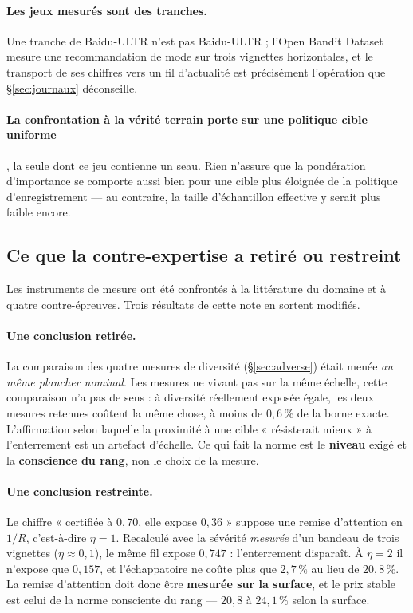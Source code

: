 \documentclass[11pt,a4paper]{article}
\begin{document}
\paragraph{Les jeux mesurés sont des tranches.} Une tranche de Baidu-ULTR n'est pas
Baidu-ULTR ; l'Open Bandit Dataset mesure une recommandation de mode sur trois vignettes
horizontales, et le transport de ses chiffres vers un fil d'actualité est précisément
l'opération que \S\ref{sec:journaux} déconseille.

\paragraph{La confrontation à la vérité terrain porte sur une politique cible uniforme}, la
seule dont ce jeu contienne un seau. Rien n'assure que la pondération d'importance se comporte
aussi bien pour une cible plus éloignée de la politique d'enregistrement --- au contraire, la
taille d'échantillon effective y serait plus faible encore.


\subsection{Ce que la contre-expertise a retiré ou restreint}
\label{sec:contreexpertise}

Les instruments de mesure ont été confrontés à la littérature du domaine et à quatre
contre-épreuves. Trois résultats de cette note en sortent modifiés.

\paragraph{Une conclusion retirée.} La comparaison des quatre mesures de diversité
(\S\ref{sec:adverse}) était menée \emph{au même plancher nominal}. Les mesures ne vivant pas sur
la même échelle, cette comparaison n'a pas de sens : à diversité réellement exposée égale, les
deux mesures retenues coûtent la même chose, à moins de $0{,}6\,\%$ de la borne exacte.
L'affirmation selon laquelle la proximité à une cible « résisterait mieux » à l'enterrement est
un artefact d'échelle. Ce qui fait la norme est le \textbf{niveau} exigé et la \textbf{conscience
du rang}, non le choix de la mesure.

\paragraph{Une conclusion restreinte.} Le chiffre « certifiée à $0{,}70$, elle expose $0{,}36$ »
suppose une remise d'attention en $1/R$, c'est-à-dire $\eta = 1$. Recalculé avec la sévérité
\emph{mesurée} d'un bandeau de trois vignettes ($\eta \approx 0{,}1$), le même fil expose
$0{,}747$ : l'enterrement disparaît. À $\eta = 2$ il n'expose que $0{,}157$, et l'échappatoire ne
coûte plus que $2{,}7\,\%$ au lieu de $20{,}8\,\%$. La remise d'attention doit donc être
\textbf{mesurée sur la surface}, et le prix stable est celui de la norme consciente du rang ---
$20{,}8$ à $24{,}1\,\%$ selon la surface.
\end{document}
